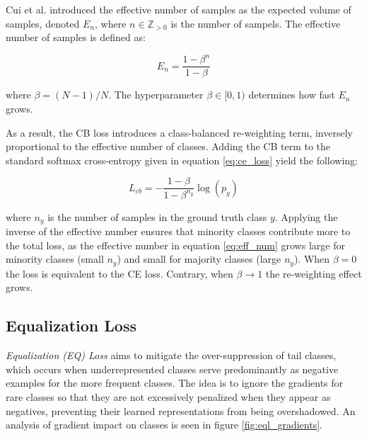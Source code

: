 Cui et al. \cite{cui2019classbalancedlossbasedeffective} introduced the effective number of samples as the expected volume of samples, denoted $E_n$, where $n \in \mathbb{Z}_{>0}$ is the number of sampels. The effective number of samples 
is defined as:

\begin{equation}
    \label{eq:eff_num}
    E_n = \frac{1-\beta^n}{1-\beta}
\end{equation}

where $\beta = (N-1)/N$. The hyperparameter $\beta \in [0,1)$ determines how fast $E_n$ grows.

As a result, the CB loss introduces a class-balanced re-weighting term, inversely proportional to the effective number of classes. Adding the CB term to the standard softmax cross-entropy given in equation \eqref{eq:ce_loss} yield the following:

\begin{equation}
    \label{eq:cb_loss}
    L_{cb} = - \frac{1 - \beta}{1 - \beta^{n_y}} \log(p_y)
\end{equation}

where $n_y$ is the number of samples in the ground truth class $y$. Applying the inverse of the effective number ensures that minority classes contribute more to the total loss, as the effective number in equation \eqref{eq:eff_num} grows large for minority classes (small $n_y$) and small for majority classes (large $n_y$). When $\beta = 0$ the loss is equivalent to the CE loss. Contrary, when $\beta \longrightarrow 1$ the re-weighting effect grows.




\subsection{Equalization Loss}
\label{sec:seql}
\emph{Equalization (EQ) Loss} \cite{tan2020equalizationlosslongtailedobject} aims to mitigate the over-suppression of tail classes, which occurs when underrepresented classes serve predominantly as negative examples for the more frequent classes. The idea is to ignore the gradients for rare classes so that they are not excessively penalized when they appear as negatives, preventing their learned representations from being overshadowed. An analysis of gradient impact on classes is seen in figure \ref{fig:eql_gradients}.


